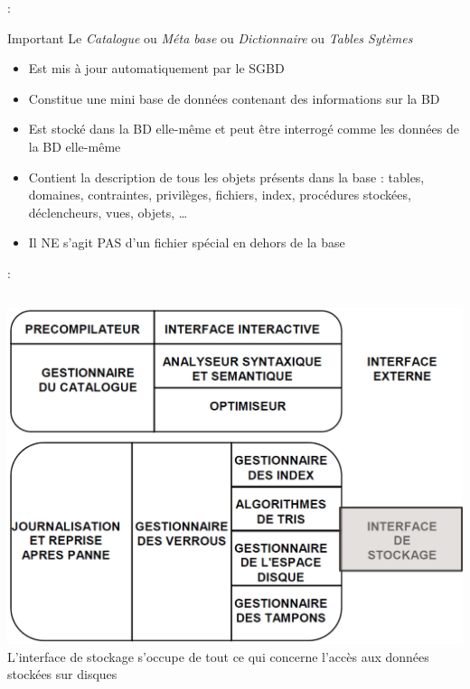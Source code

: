\documentclass[10pt]{beamer}
\begin{document}
\begin{frame}{\secname : \subsecname}
    \begin{alertblock}{Important}
        Le \emph{Catalogue} ou \emph{Méta base} ou \emph{Dictionnaire} ou \emph{Tables Sytèmes}
        \begin{itemize}
            \item Est mis à jour automatiquement par le SGBD
            \item Constitue une mini base de données contenant des informations sur la BD
            \item Est stocké dans la BD elle-même et peut être interrogé comme les données de la BD elle-même
            \item Contient la description de tous les objets présents dans la base : tables, domaines, contraintes, privilèges, fichiers, index, procédures stockées, déclencheurs, vues, objets, …
            \item Il NE s’agit PAS d’un fichier spécial en dehors de la base
        \end{itemize}
    \end{alertblock}
\end{frame}

\begin{frame}{\secname : \subsecname}
    \begin{columns}
        \includegraphics[width=0.8\linewidth]{../assets/img/architecture_sgbd--3.jpg}
        L’interface de stockage s’occupe de tout ce qui concerne l’accès aux données stockées sur disques
    \end{columns}
\end{frame}
\end{document}
